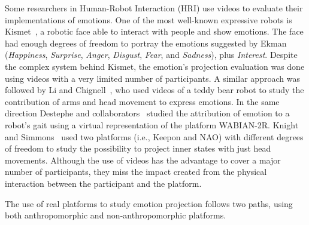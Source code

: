 Some researchers in Human-Robot Interaction (HRI) use videos to evaluate their implementations of emotions. One of the most well-known expressive robots is Kismet~\cite{Breazeal2002}, a robotic face able to interact with people and show emotions. The face had enough degrees of freedom to portray the emotions suggested by Ekman~\cite{Ekman2004} (\textit{Happiness}, \textit{Surprise}, \textit{Anger}, \textit{Disgust}, \textit{Fear}, and \textit{Sadness}), plus \textit{Interest}. 
Despite the complex system behind Kismet, the emotion's projection evaluation was done using videos with a very limited number of participants. A similar approach was followed by Li and Chignell~\cite{Li2011}, who used videos of a teddy bear robot to study the contribution of arms and head movement to express emotions. In the same direction Destephe and collaborators~\cite{Destephe2013} studied the attribution of emotion to a robot's gait using a virtual representation of the platform WABIAN-2R. Knight and Simmons~\cite{knight2016} used two platforms (i.e., Keepon and NAO) with different degrees of freedom to study the possibility to project inner states with just head movements. Although the use of videos has the advantage to cover a major number of participants, they miss the impact created from the physical interaction between the participant and the platform.

The use of real platforms to study emotion projection follows two paths, using both anthropomorphic and non-anthropomorphic platforms. 

